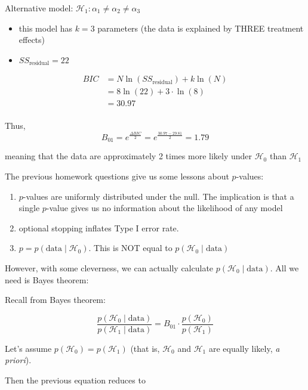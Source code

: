 \documentclass[portrait,footrule,17pt]{foils}
\begin{document}
\foilhead[-1cm]{}
\label{sec:orgc09e306}
Alternative model: \(\mathcal{H}_1:\alpha_1 \neq\alpha_2 \neq \alpha_3\)
\begin{itemize}
\item this model has \(k=3\) parameters (the data is explained by THREE treatment effects)
\item \(SS_{\text{residual}} = 22\)
\end{itemize}

\begin{align*}
BIC &= N\ln (SS_{\text{residual}})+k\ln(N)\\
&= 8\ln(22) + 3\cdot \ln(8)\\
&= 30.97\\
\end{align*}

Thus, 
\[
B_{01} = e^\frac{\Delta BIC}{2} = e^{\frac{30.97-29.81}{2}} = 1.79
\]

meaning that the data are approximately 2 times more likely under \(\mathcal{H}_0\) than \(\mathcal{H}_1\)

\label{sec:org3197931}
The previous homework questions give us some lessons about \(p\)-values:

\begin{enumerate}
\item \(p\)-values are uniformly distributed under the null.  The implication is that a single \(p\)-value gives us no information about the likelihood of any model
\item optional stopping inflates Type I error rate.
\item \(p=p(\text{data}\mid \mathcal{H}_0)\).  This is NOT equal to \(p(\mathcal{H}_0\mid \text{data})\)
\end{enumerate}

However, with some cleverness, we can actually calculate \(p(\mathcal{H}_0\mid \text{data})\).  All we need is Bayes theorem:

\label{sec:orgc84d8f8}

Recall from Bayes theorem:

\[
\frac{p(\mathcal{H}_0\mid \text{data})}{p(\mathcal{H}_1\mid \text{data})} = B_{01}\cdot \frac{p(\mathcal{H}_0)}{p(\mathcal{H}_1)}
\]

Let's assume \(p(\mathcal{H}_0)=p(\mathcal{H}_1)\) (that is, \(\mathcal{H}_0\) and \(\mathcal{H}_1\) are equally likely, \emph{a priori}).

Then the previous equation reduces to
\end{document}
